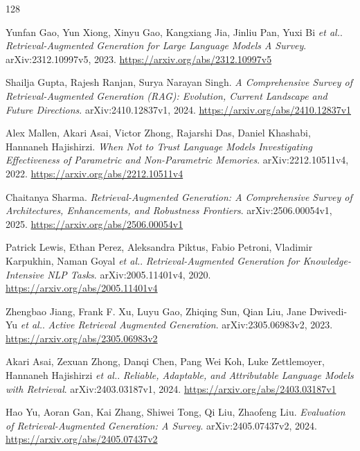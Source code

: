 \documentclass[11pt,a4paper]{article}
\begin{document}
\begin{thebibliography}{128}
\setlength{\itemsep}{2pt}

Yunfan Gao, Yun Xiong, Xinyu Gao, Kangxiang Jia, Jinliu Pan, Yuxi Bi \emph{et al.}.
\newblock \emph{Retrieval-Augmented Generation for Large Language Models A Survey}.
\newblock arXiv:2312.10997v5, 2023.
\newblock \url{https://arxiv.org/abs/2312.10997v5}

Shailja Gupta, Rajesh Ranjan, Surya Narayan Singh.
\newblock \emph{A Comprehensive Survey of Retrieval-Augmented Generation (RAG): Evolution, Current Landscape and Future Directions}.
\newblock arXiv:2410.12837v1, 2024.
\newblock \url{https://arxiv.org/abs/2410.12837v1}

Alex Mallen, Akari Asai, Victor Zhong, Rajarshi Das, Daniel Khashabi, Hannaneh Hajishirzi.
\newblock \emph{When Not to Trust Language Models Investigating Effectiveness of Parametric and Non-Parametric Memories}.
\newblock arXiv:2212.10511v4, 2022.
\newblock \url{https://arxiv.org/abs/2212.10511v4}

Chaitanya Sharma.
\newblock \emph{Retrieval-Augmented Generation: A Comprehensive Survey of Architectures, Enhancements, and Robustness Frontiers}.
\newblock arXiv:2506.00054v1, 2025.
\newblock \url{https://arxiv.org/abs/2506.00054v1}

Patrick Lewis, Ethan Perez, Aleksandra Piktus, Fabio Petroni, Vladimir Karpukhin, Naman Goyal \emph{et al.}.
\newblock \emph{Retrieval-Augmented Generation for Knowledge-Intensive NLP Tasks}.
\newblock arXiv:2005.11401v4, 2020.
\newblock \url{https://arxiv.org/abs/2005.11401v4}

Zhengbao Jiang, Frank F. Xu, Luyu Gao, Zhiqing Sun, Qian Liu, Jane Dwivedi-Yu \emph{et al.}.
\newblock \emph{Active Retrieval Augmented Generation}.
\newblock arXiv:2305.06983v2, 2023.
\newblock \url{https://arxiv.org/abs/2305.06983v2}

Akari Asai, Zexuan Zhong, Danqi Chen, Pang Wei Koh, Luke Zettlemoyer, Hannaneh Hajishirzi \emph{et al.}.
\newblock \emph{Reliable, Adaptable, and Attributable Language Models with Retrieval}.
\newblock arXiv:2403.03187v1, 2024.
\newblock \url{https://arxiv.org/abs/2403.03187v1}

Hao Yu, Aoran Gan, Kai Zhang, Shiwei Tong, Qi Liu, Zhaofeng Liu.
\newblock \emph{Evaluation of Retrieval-Augmented Generation: A Survey}.
\newblock arXiv:2405.07437v2, 2024.
\newblock \url{https://arxiv.org/abs/2405.07437v2}


\end{thebibliography}
\end{document}
